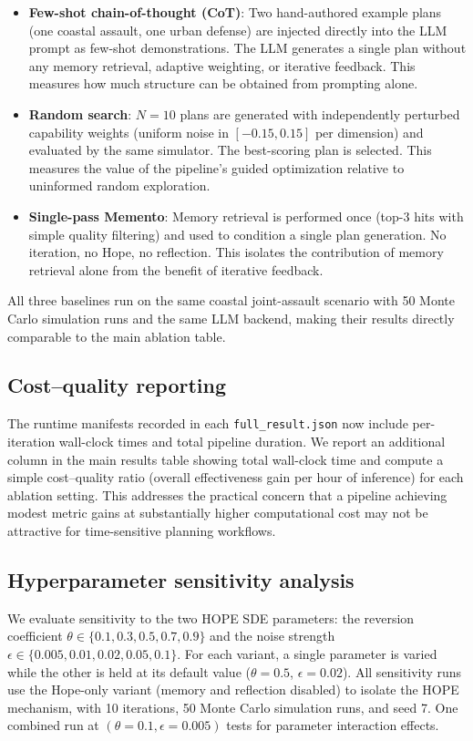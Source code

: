 \begin{itemize}
\item \textbf{Few-shot chain-of-thought (CoT)}: Two hand-authored example plans (one coastal assault, one urban defense) are injected directly into the LLM prompt as few-shot demonstrations. The LLM generates a single plan without any memory retrieval, adaptive weighting, or iterative feedback. This measures how much structure can be obtained from prompting alone.
\item \textbf{Random search}: $N=10$ plans are generated with independently perturbed capability weights (uniform noise in $[-0.15, 0.15]$ per dimension) and evaluated by the same simulator. The best-scoring plan is selected. This measures the value of the pipeline's guided optimization relative to uninformed random exploration.
\item \textbf{Single-pass Memento}: Memory retrieval is performed once (top-3 hits with simple quality filtering) and used to condition a single plan generation. No iteration, no Hope, no reflection. This isolates the contribution of memory retrieval alone from the benefit of iterative feedback.
\end{itemize}

All three baselines run on the same coastal joint-assault scenario with 50 Monte Carlo simulation runs and the same LLM backend, making their results directly comparable to the main ablation table.

\subsection{Cost--quality reporting}

The runtime manifests recorded in each \texttt{full\_result.json} now include per-iteration wall-clock times and total pipeline duration. We report an additional column in the main results table showing total wall-clock time and compute a simple cost--quality ratio (overall effectiveness gain per hour of inference) for each ablation setting. This addresses the practical concern that a pipeline achieving modest metric gains at substantially higher computational cost may not be attractive for time-sensitive planning workflows.

\subsection{Hyperparameter sensitivity analysis}
\label{sec:hyperparam-sensitivity}

We evaluate sensitivity to the two HOPE SDE parameters: the reversion coefficient $\theta \in \{0.1, 0.3, 0.5, 0.7, 0.9\}$ and the noise strength $\epsilon \in \{0.005, 0.01, 0.02, 0.05, 0.1\}$. For each variant, a single parameter is varied while the other is held at its default value ($\theta=0.5$, $\epsilon=0.02$). All sensitivity runs use the Hope-only variant (memory and reflection disabled) to isolate the HOPE mechanism, with 10 iterations, 50 Monte Carlo simulation runs, and seed 7. One combined run at $(\theta=0.1, \epsilon=0.005)$ tests for parameter interaction effects.
